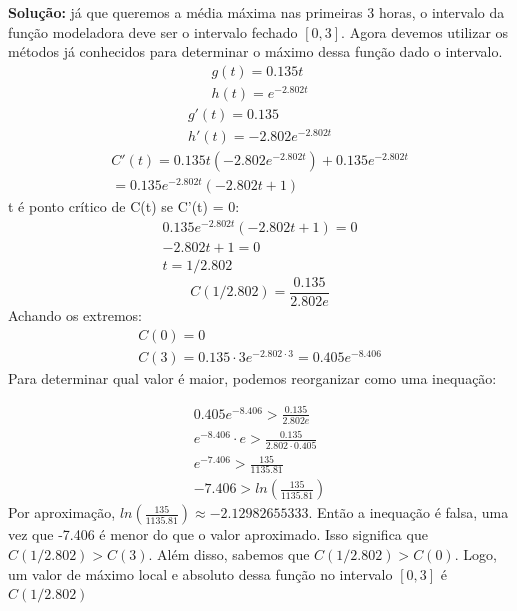 \textbf{Solução:} já que queremos a média máxima nas primeiras 3 horas, o intervalo da função modeladora deve ser o intervalo fechado $[0, 3]$. Agora devemos utilizar os métodos já conhecidos para determinar o máximo dessa função dado o intervalo.
\begin{equation}
    \begin{split}
        g(t)=0.135t \\
        h(t)=e^{-2.802t}
    \end{split}
\end{equation}
\begin{equation}
    \begin{split}
        g'(t)=0.135 \\
        h'(t)=-2.802e^{-2.802t}
    \end{split}
\end{equation}
\begin{equation}
    \begin{split}
        C'(t) = 0.135t(-2.802e^{-2.802t}) + 0.135e^{-2.802t} \\
        = 0.135e^{-2.802t}(-2.802t + 1)
    \end{split}
\end{equation}
t é ponto crítico de C(t) se C'(t) = 0:
\begin{equation}
    \begin{split}
        0.135e^{-2.802t}(-2.802t + 1) = 0 \\
        -2.802t + 1 = 0 \\
        t = 1/2.802
    \end{split}
\end{equation}
\begin{equation}
    C(1/2.802) = \frac{0.135}{2.802e}
\end{equation}
Achando os extremos:
\begin{equation}
    \begin{split}
        C(0) = 0 \\
        C(3) = 0.135 \cdot 3e^{-2.802 \cdot 3} = 0.405e^{-8.406} 
    \end{split}
\end{equation}
Para determinar qual valor é maior, podemos reorganizar como uma inequação:

\begin{equation}
    \begin{split}
        0.405e^{-8.406} > \frac{0.135}{2.802e} \\
        e^{-8.406} \cdot e > \frac{0.135}{2.802 \cdot 0.405} \\
        e^{-7.406} > \frac{135}{1135.81} \\
        -7.406 > ln(\frac{135}{1135.81})
    \end{split}
\end{equation}
Por aproximação, $ln(\frac{135}{1135.81}) \approx -2.12982655333$. Então a inequação é falsa, uma vez que -7.406 é menor do que o valor aproximado. Isso significa que $C(1/2.802) > C(3)$. Além disso, sabemos que $C(1/2.802) > C(0)$. Logo, um valor de máximo local e absoluto dessa função no intervalo $[0, 3]$ é $C(1/2.802)$

